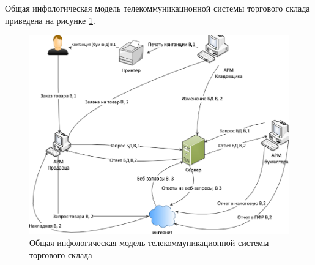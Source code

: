 Общая инфологическая модель телекоммуникационной системы торгового склада приведена на рисунке \ref{fig:total}.

\begin{figure}[H]
  \centering
  \includegraphics[width=\linewidth]{sec1/img/total.png}
  \caption{Общая инфологическая модель телекоммуникационной системы торгового склада}
  \label{fig:total}
\end{figure}

